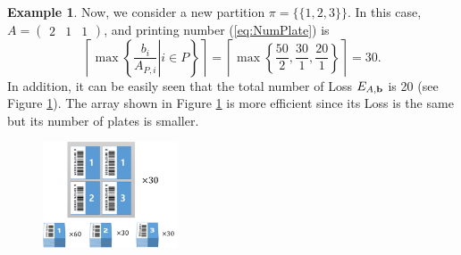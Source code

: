 \documentclass[a4paper]{amsart}
\numberwithin{equation}{section} %
\numberwithin{figure}{section} %
\numberwithin{table}{section}
\theoremstyle{plain}
\theoremstyle{definition}
\newtheorem{example}[thm]{Example}
\theoremstyle{plain}
\theoremstyle{plain}
\theoremstyle{plain}
\theoremstyle{plain}
\theoremstyle{plain}
\begin{document}
\begin{example}
	Now, we consider a new partition $\pi = \{\{1,2,3\}\}$. In this case, $A = (\begin{array}{ccc}2 & 1 & 1 \end{array})$, and printing number (\ref{eq:NumPlate}) is 
	\begin{equation}
	\left\lceil \max\left\{ \left. \frac{b_{i}}{A_{P,i}} \right| i \in P \right\} \right\rceil = \left\lceil \max \left\{ \frac{50}{2}, \frac{30}{1}, \frac{20}{1} \right\} \right\rceil = 30.
	\end{equation}
	In addition, it can be easily seen that the total number of Loss $E_{A,{\bf b}}$ is 20 (see Figure \ref{fig:ex12}).
	The array shown in Figure \ref{fig:ex12} is more efficient since its Loss is the same but its number of plates is smaller.
	\begin{figure}[h!]
		\centering
		\includegraphics[width=4cm]{ex12.pdf}
		\caption{}
		\label{fig:ex12}       %
	\end{figure}
\end{example}
\end{document}
